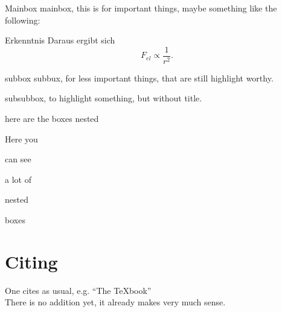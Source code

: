 \documentclass[twocolumn]{article}
\begin{document}
\begin{mainbox}{Mainbox}
    mainbox, this is for important things, maybe something like the following:

\begin{mainbox}{Erkenntnis}
    Daraus ergibt sich
    \[ F_{el} \propto \frac{1}{r^2} .\] 
\end{mainbox}
\end{mainbox}


\begin{subbox}{subbox}
    subbux, for less important things, that are still highlight worthy.
\end{subbox}


\begin{subsubbox}
    subsubbox, to highlight something, but without title.
\end{subsubbox}

here are the boxes nested
\begin{mainbox}{Here you}
    \begin{ff}{can see}
        \begin{aufgabe}{a lot of}
            \begin{subbox}{nested}
                \begin{subsubbox}
                    boxes
                \end{subsubbox}
            \end{subbox}
        \end{aufgabe}
    \end{ff}
\end{mainbox}



\section{Citing}
One cites as usual, e.g. ``The \TeX{}book''~\cite{knuth1986texbook}\\
There is no addition yet, it already makes very much sense.



\printbibliography
\end{document}

